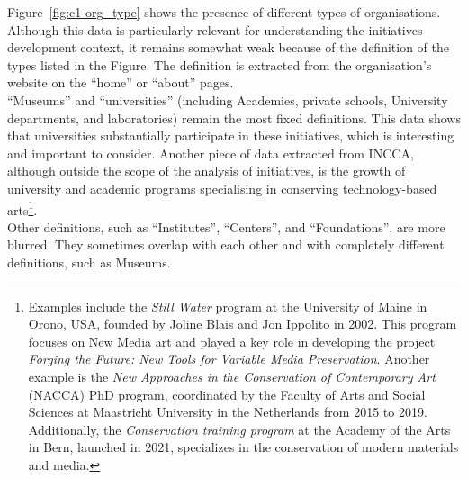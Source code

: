 Figure~\ref{fig:c1-org_type} shows the presence of different types of organisations. Although this data is particularly relevant for understanding the initiatives development context, it remains somewhat weak because of the definition of the types listed in the Figure. The definition is extracted from the organisation's website on the ``home'' or ``about'' pages.\\
``Museums'' and ``universities'' (including Academies, private schools, University departments, and laboratories) remain the most fixed definitions. This data shows that universities substantially participate in these initiatives, which is interesting and important to consider. Another piece of data extracted from INCCA, although outside the scope of the analysis of initiatives, is the growth of university and academic programs specialising in conserving technology-based arts\footnote{Examples include the \textit{Still Water} program at the University of Maine in Orono, USA, founded by Joline Blais and Jon Ippolito in 2002. This program focuses on New Media art and played a key role in developing the project \textit{Forging the Future: New Tools for Variable Media Preservation}. Another example is the \textit{New Approaches in the Conservation of Contemporary Art} (NACCA) PhD program, coordinated by the Faculty of Arts and Social Sciences at Maastricht University in the Netherlands from 2015 to 2019. Additionally, the \textit{Conservation training program} at the Academy of the Arts in Bern, launched in 2021, specializes in the conservation of modern materials and media.}.\\
Other definitions, such as ``Institutes'', ``Centers'', and ``Foundations'', are more blurred. They sometimes overlap with each other and with completely different definitions, such as Museums.\\
